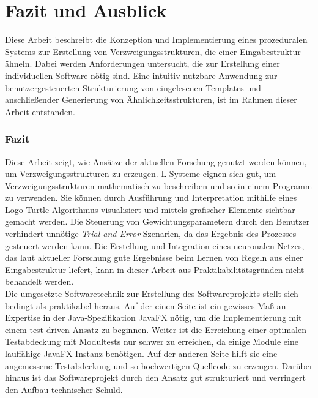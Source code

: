 
\chapter{Fazit und Ausblick}
Diese Arbeit beschreibt die Konzeption und Implementierung eines prozeduralen Systems zur Erstellung
von Verzweigungsstrukturen, die einer Eingabestruktur ähneln.
Dabei werden Anforderungen untersucht, die zur Erstellung einer individuellen Software nötig sind.
Eine intuitiv nutzbare Anwendung zur benutzergesteuerten Strukturierung von eingelesenen Templates und
anschließender Generierung von Ähnlichkeitsstrukturen, ist im Rahmen dieser Arbeit entstanden.

\subsection*{Fazit}
Diese Arbeit zeigt, wie Ansätze der aktuellen Forschung genutzt werden können, um Verzweigungsstrukturen
zu erzeugen.
L-Systeme eignen sich gut, um Verzweigungsstrukturen mathematisch zu beschreiben und so in einem
Programm zu verwenden.
Sie können durch Ausführung und Interpretation mithilfe eines Logo-Turtle-Algorithmus visualisiert
und mittels grafischer Elemente sichtbar gemacht werden.
Die Steuerung von Gewichtungsparametern durch den Benutzer verhindert unnötige
\textit{Trial and Error}-Szenarien, da das Ergebnis des Prozesses gesteuert werden kann.
Die Erstellung und Integration eines neuronalen Netzes, das laut aktueller Forschung gute Ergebnisse beim Lernen von
Regeln aus einer Eingabestruktur liefert, kann in dieser Arbeit aus Praktikabilitätsgründen nicht behandelt werden.\\
Die umgesetzte Softwaretechnik zur Erstellung des Softwareprojekts stellt sich bedingt als praktikabel
heraus.
Auf der einen Seite ist ein gewisses Maß an Expertise in der Java-Spezifikation JavaFX nötig, um
die Implementierung mit einem test-driven Ansatz zu beginnen.
Weiter ist die Erreichung einer optimalen Testabdeckung mit Modultests nur schwer
zu erreichen, da einige Module eine lauffähige JavaFX-Instanz benötigen.
Auf der anderen Seite hilft sie eine angemessene Testabdeckung und so hochwertigen Quellcode
zu erzeugen.
Darüber hinaus ist das Softwareprojekt durch den Ansatz gut strukturiert und verringert
den Aufbau technischer Schuld.

